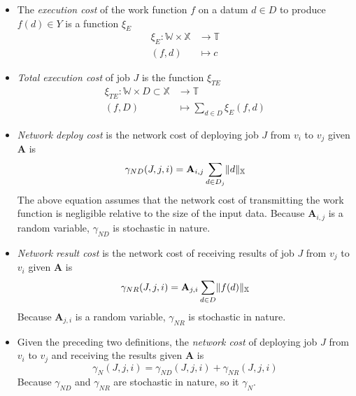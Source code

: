 \documentclass[../mthe-493-project-proposal.tex]{subfiles}
\begin{document}
    \begin{itemize}
        \item The \textit{execution cost} of the work function $f$ on a datum $d \in D$ to      produce $f(d) \in Y$ is a function $\xi_E$
              \begin{align*}
                  \xi_E \colon \mathbb{W} \times \mathbb{X} &\to \mathbb{T} \\
                  (f, d)                                    &\mapsto c
              \end{align*}

        \item \textit{Total execution cost} of job $J$ is the function $\xi_{TE}$
              \begin{align*}
                  \xi_{TE} \colon \mathbb{W} \times D \subset \mathbb{X} &\to \mathbb{T}                            \\
                  (f, D)                                                 &\mapsto \sum\limits_{d \in D} \xi_E(f, d)
              \end{align*}

        \item \textit{Network deploy cost} is the network cost of deploying job $J$ from $v_i$ to $v_j$ given $\mathbf{A}$ is
              \begin{equation*}
                  \gamma_{ND}(J, j, i) = \mathbf{A}_{i,j} \sum\limits_{d \in D_j} \lVert d\rVert_{\mathbb{X}}
              \end{equation*}
              The above equation assumes that the network cost of transmitting the work function is negligible relative to the size of the input data. Because $\mathbf{A}_{i,j}$ is a random variable, $\gamma_{ND}$ is stochastic in nature.

        \item \textit{Network result cost} is the network cost of receiving results of job $J$ from     $v_j$ to $v_i$ given $\mathbf{A}$ is
              \begin{equation*}
                  \gamma_{NR}(J, j, i) = \mathbf{A}_{j,i} \sum\limits_{d \in D} \lVert f(d)\rVert_{\mathbb{X}}
              \end{equation*}
              Because $\mathbf{A}_{j,i}$ is a random variable, $\gamma_{NR}$ is stochastic in nature.

        \item Given the preceding two definitions, the \textit{network cost} of deploying job $J$ from $v_i$ to $v_j$ and receiving the results  given $\mathbf{A}$ is
              \begin{equation*}
                  \gamma_N(J, j, i) = \gamma_{ND}(J, j, i) + \gamma_{NR}(J, j, i)
              \end{equation*}
              Because $\gamma_{ND}$ and $\gamma_{NR}$ are stochastic in nature, so it $\gamma_N$.
    \end{itemize}
\end{document}
